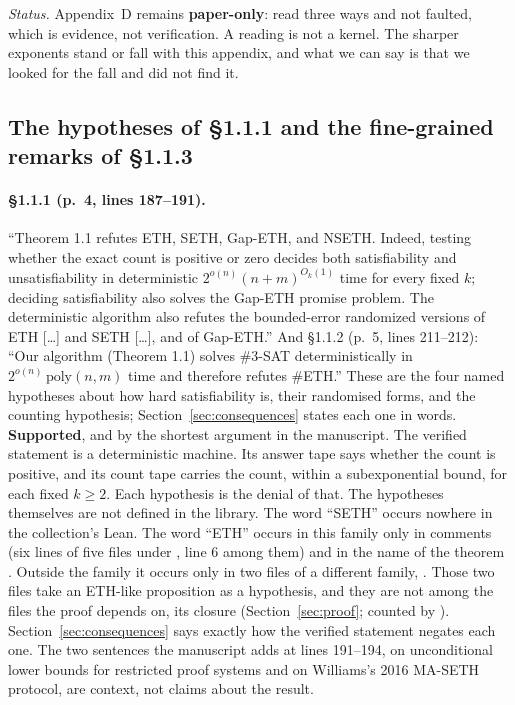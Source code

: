 \emph{Status.} Appendix~D remains \textbf{paper-only}: read three ways
and not faulted, which is evidence, not verification. A reading is not a
kernel. The sharper exponents stand or fall with this appendix, and what
we can say is that we looked for the fall and did not find it.

\subsection{The hypotheses of \S1.1.1 and the fine-grained remarks of \S1.1.3}
\label{sec:beyond-hypotheses}

\paragraph{\S1.1.1 (p.~4, lines 187--191).}
``Theorem 1.1 refutes ETH, SETH, Gap-ETH, and NSETH. Indeed, testing
whether the exact count is positive or zero decides both satisfiability
and unsatisfiability in deterministic $2^{o(n)}(n+m)^{O_k(1)}$ time for
every fixed $k$; deciding satisfiability also solves the Gap-ETH promise
problem. The deterministic algorithm also refutes the bounded-error
randomized versions of ETH [\ldots] and SETH [\ldots], and of Gap-ETH.''
And \S1.1.2 (p.~5, lines 211--212): ``Our algorithm (Theorem 1.1) solves
\#3-SAT deterministically in $2^{o(n)}\,\mathrm{poly}(n,m)$ time and
therefore refutes \#ETH.'' These are the four named hypotheses about how
hard satisfiability is, their randomised forms, and the counting
hypothesis; Section~\ref{sec:consequences} states each one in words.
\textbf{Supported}, and by the shortest argument in the manuscript. The
verified statement is a deterministic machine. Its answer tape says
whether the count is positive, and its count tape carries the count,
within a subexponential bound, for each fixed $k \ge 2$. Each hypothesis
is the denial of that. The hypotheses themselves are not defined in the
library. The word ``SETH'' occurs nowhere in the collection's Lean. The
word ``ETH'' occurs in this family only in comments (six lines of five
files under ,  line 6
among them) and in the name of the theorem . Outside
the family it occurs only in two files of a different family,
. Those two files take an ETH-like
proposition as a hypothesis, and they are not among the files the proof depends
on, its closure (Section~\ref{sec:proof}; counted by
).
Section~\ref{sec:consequences} says exactly how the verified statement
negates each one. The two sentences the manuscript adds at lines
191--194, on unconditional lower bounds for restricted proof systems and
on Williams's 2016 MA-SETH protocol, are context, not claims about the
result.

